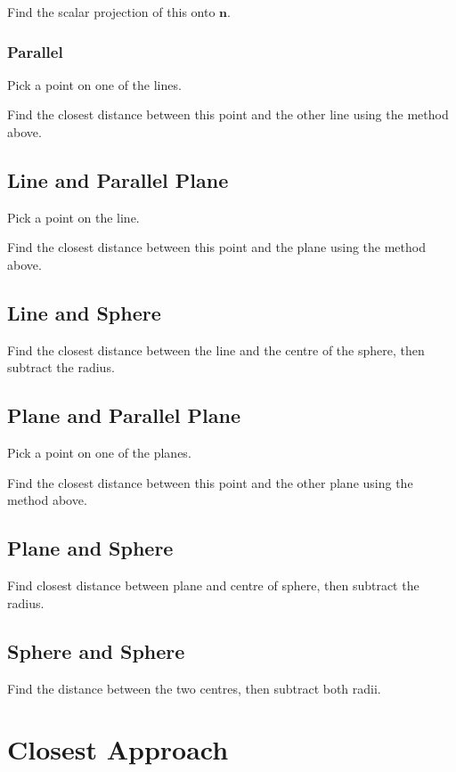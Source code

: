 \documentclass[a4paper,11pt]{article}
\newcommand{\bb}{\boldsymbol}
\begin{document}
Find the scalar projection of this onto $\bb{n}$.


\subsubsection{Parallel}

Pick a point on one of the lines.

Find the closest distance between this point and the other line using the
method above.


\subsection{Line and Parallel Plane}

Pick a point on the line.

Find the closest distance between this point and the plane using the method
above.


\subsection{Line and Sphere}

Find the closest distance between the line and the centre of the sphere, then
subtract the radius.


\subsection{Plane and Parallel Plane}

Pick a point on one of the planes.

Find the closest distance between this point and the other plane using the
method above.


\subsection{Plane and Sphere}

Find closest distance between plane and centre of sphere, then subtract the
radius.


\subsection{Sphere and Sphere}

Find the distance between the two centres, then subtract both radii.




\section{Closest Approach}
\end{document}
